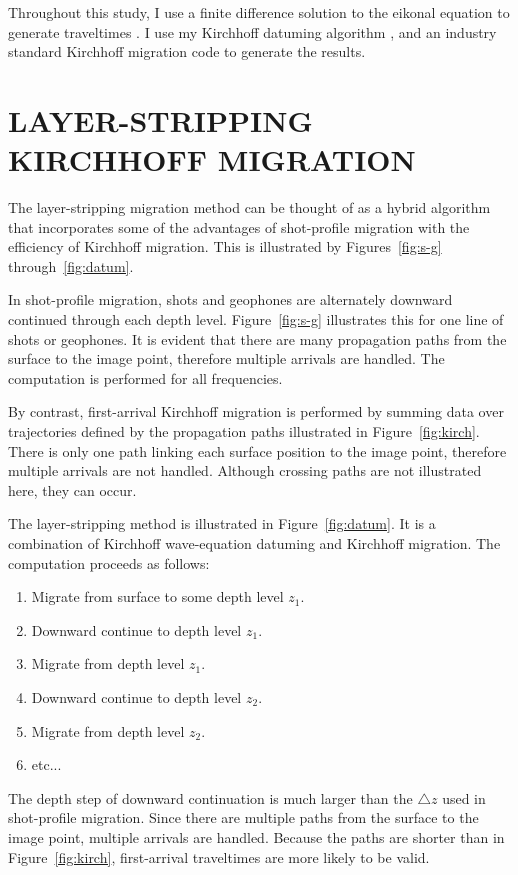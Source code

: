 Throughout this study, I use a finite difference solution to the
eikonal equation to generate traveltimes \cite[]{GEO56-06-08120821}.
I use my Kirchhoff datuming algorithm \cite[]{Bevc.sep.77.131}, and an
industry standard Kirchhoff migration code to generate the results.

\section{LAYER-STRIPPING KIRCHHOFF MIGRATION}

The layer-stripping migration method can be thought of as a hybrid 
algorithm that incorporates some of the advantages of shot-profile
migration with the efficiency of Kirchhoff migration.
This is illustrated by Figures~\ref{fig:s-g} through~\ref{fig:datum}.

In shot-profile migration, shots and geophones are
alternately downward continued through each depth level.
Figure~\ref{fig:s-g} illustrates this for one line of shots or geophones.  
It is evident that there are many propagation paths from the surface
to the image point, therefore multiple arrivals are handled.
The computation is performed for all frequencies.

By contrast, first-arrival Kirchhoff migration is performed 
by summing data over trajectories defined by the propagation paths
illustrated in Figure~\ref{fig:kirch}. There is only one path linking
each surface position to the image point, therefore multiple arrivals are
not handled. Although crossing paths are not illustrated here, they can occur.

The layer-stripping method is illustrated in Figure~\ref{fig:datum}.
It is a combination of Kirchhoff wave-equation datuming \cite[]{GEO44-08-13291344,GEO49-11-20642067} 
and Kirchhoff migration. 
The computation proceeds as follows:
\begin{enumerate}
	\item Migrate from surface to some depth level $z_1$.
	\item Downward continue to depth level $z_1$.
	\item Migrate from depth level $z_1$.
	\item Downward continue to depth level $z_2$.
	\item Migrate from depth level $z_2$.
	\item etc...
\end{enumerate}
The depth step of downward continuation is much larger than the
$\triangle z$ used in shot-profile migration. Since
there are multiple paths from the surface to the image point,
multiple arrivals are handled. Because the paths are shorter than
in Figure~\ref{fig:kirch}, first-arrival traveltimes are more likely to 
be valid.

